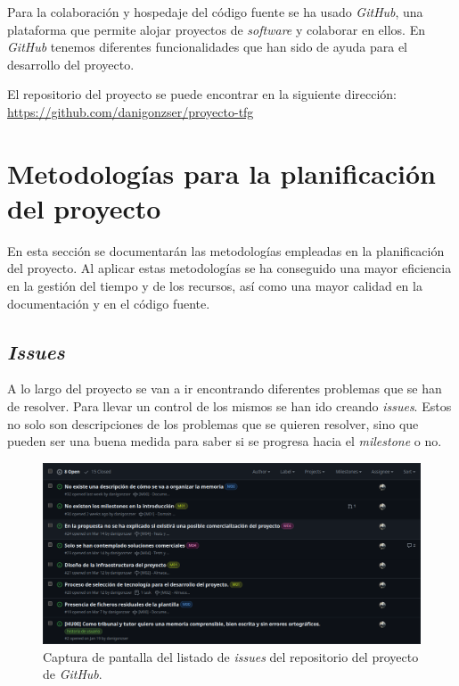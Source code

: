 Para la colaboración y hospedaje del código fuente se ha usado \textit{GitHub}, una plataforma que permite alojar proyectos de \textit{software} y colaborar en ellos. En \textit{GitHub} tenemos diferentes funcionalidades que han sido de ayuda para el desarrollo del proyecto.

El repositorio del proyecto se puede encontrar en la siguiente dirección: \url{https://github.com/danigonzser/proyecto-tfg}

\section{Metodologías para la planificación del proyecto}

En esta sección se documentarán las metodologías empleadas en la planificación del proyecto. Al aplicar estas metodologías se ha conseguido una mayor eficiencia en la gestión del tiempo y de los recursos, así como una mayor calidad en la documentación y en el código fuente.

\subsection{\textit{Issues}}

A lo largo del proyecto se van a ir encontrando diferentes problemas que se han de resolver. Para llevar un control de los mismos se han ido creando \textit{issues}. Estos no solo son descripciones de los problemas que se quieren resolver, sino que pueden ser una buena medida para saber si se progresa hacia el \textit{milestone} o no.

\begin{figure}[H]
    \caption{Captura de pantalla del listado de \textit{issues} del repositorio del proyecto de \textit{GitHub}.}
    \centering
    \vspace*{0.5cm}
    \includegraphics[scale=0.2]{figuras/github_issues.png}
\end{figure}

